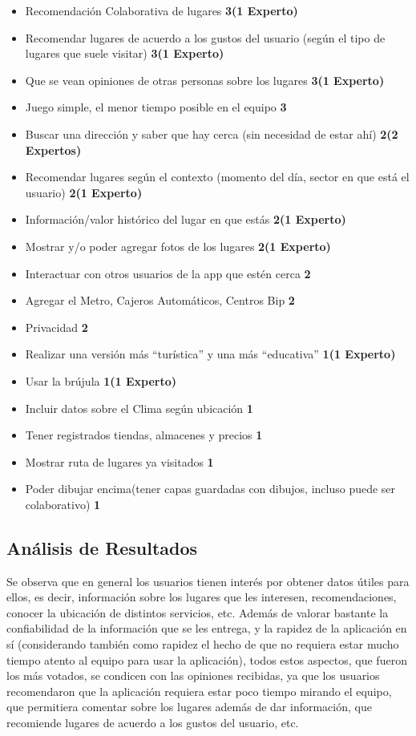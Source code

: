 \documentclass[10pt,letterpaper]{article}
\begin{document}
\begin{itemize}
\item Recomendación Colaborativa de lugares \textbf{3(1 Experto)}
\item Recomendar lugares de acuerdo a los gustos del usuario (según el tipo de lugares que suele visitar)  \textbf{3(1 Experto)}
\item Que se vean opiniones de otras personas sobre los lugares \textbf{3(1 Experto)}
\item Juego simple, el menor tiempo posible en el equipo \textbf{3}
\item Buscar una dirección y saber que hay cerca (sin necesidad de estar ahí) \textbf{2(2 Expertos)}
\item Recomendar lugares según el contexto (momento del día, sector en que está el usuario) \textbf{2(1 Experto)}
\item Información/valor histórico del lugar en que estás \textbf{2(1 Experto)}
\item Mostrar y/o poder agregar fotos de los lugares \textbf{2(1 Experto)}
\item Interactuar con otros usuarios de la app que estén cerca \textbf{2}
\item Agregar el Metro, Cajeros Automáticos, Centros Bip \textbf{2}
\item Privacidad \textbf{2}
\item Realizar una versión más “turística” y una más “educativa” \textbf{1(1 Experto)}
\item Usar la brújula \textbf{1(1 Experto)}
\item Incluir datos sobre el Clima según ubicación \textbf{1}
\item Tener registrados tiendas, almacenes y precios \textbf{1}
\item Mostrar ruta de lugares ya visitados \textbf{1} 
\item Poder dibujar encima(tener capas guardadas con dibujos, incluso puede ser colaborativo) \textbf{1}
\end{itemize}

\subsection{Análisis de Resultados}

Se observa que en general los usuarios tienen interés por obtener datos útiles para ellos, es decir, información sobre los lugares que les interesen, recomendaciones, conocer la ubicación de distintos servicios, etc. Además de valorar bastante la confiabilidad de la información que se les entrega, y la rapidez de la aplicación en sí (considerando también como rapidez el hecho de que no requiera estar mucho tiempo atento al equipo para usar la aplicación), todos estos aspectos, que fueron los más votados, se condicen con las opiniones recibidas, ya que los usuarios recomendaron que la aplicación requiera estar poco tiempo mirando el equipo, que permitiera comentar sobre los lugares además de dar información, que recomiende lugares de acuerdo a los gustos del usuario, etc.\\
\end{document}
